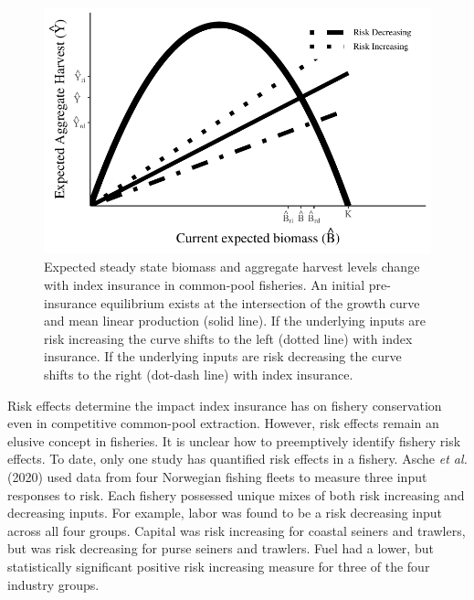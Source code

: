 \documentclass[
  letterpaper,
  DIV=11,
  numbers=noendperiod]{scrartcl}
\theoremstyle{plain}
\theoremstyle{plain}
\theoremstyle{remark}
\begin{document}
\begin{figure}

{\centering \includegraphics{ibi-behavior_files/figure-pdf/fig-synas-1.pdf}

}

\caption{\label{fig-synas}Expected steady state biomass and aggregate
harvest levels change with index insurance in common-pool fisheries. An
initial pre-insurance equilibrium exists at the intersection of the
growth curve and mean linear production (solid line). If the underlying
inputs are risk increasing the curve shifts to the left (dotted line)
with index insurance. If the underlying inputs are risk decreasing the
curve shifts to the right (dot-dash line) with index insurance.}

\end{figure}

Risk effects determine the impact index insurance has on fishery
conservation even in competitive common-pool extraction. However, risk
effects remain an elusive concept in fisheries. It is unclear how to
preemptively identify fishery risk effects. To date, only one study has
quantified risk effects in a fishery. Asche \emph{et al.} (2020) used
data from four Norwegian fishing fleets to measure three input responses
to risk. Each fishery possessed unique mixes of both risk increasing and
decreasing inputs. For example, labor was found to be a risk decreasing
input across all four groups. Capital was risk increasing for coastal
seiners and trawlers, but was risk decreasing for purse seiners and
trawlers. Fuel had a lower, but statistically significant positive risk
increasing measure for three of the four industry groups.
\end{document}

